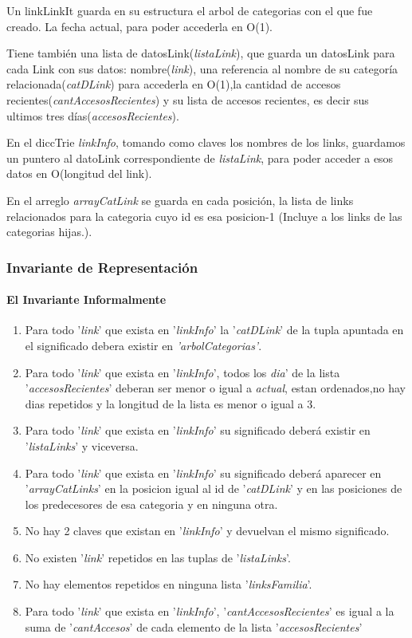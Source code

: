 \par Un linkLinkIt guarda en su estructura el arbol de categorias con el que fue creado. La fecha actual, para poder accederla en O(1).
\par Tiene también una lista de datosLink(\textit{listaLink}), que guarda un datosLink para cada Link con sus datos: nombre(\textit{link}), una referencia al nombre de su categoría relacionada(\textit{catDLink}) para accederla en O(1),la cantidad de accesos recientes(\textit{cantAccesosRecientes}) y su lista de accesos recientes, es decir sus ultimos tres días(\textit{accesosRecientes}).
\par En el diccTrie \textit{linkInfo}, tomando como claves los nombres de los links, guardamos un puntero al datoLink correspondiente de \textit{listaLink}, para poder acceder a esos datos en O(longitud del link).
\par En el arreglo \textit{arrayCatLink} se guarda en cada posición, la lista de links relacionados para la categoria cuyo id es esa posicion-1 (Incluye a los links de las categorias hijas.).

\subsubsection{Invariante de Representaci\'on}
\paragraph{El Invariante Informalmente}
\begin{enumerate}
\item Para todo '\textit{link}' que exista en '\textit{linkInfo}' la '\textit{catDLink}' de la tupla apuntada en el significado debera existir en \textit{'arbolCategorias'}.
\item Para todo '\textit{link}' que exista en '\textit{linkInfo}', todos los \textit{dia}' de la lista '\textit{accesosRecientes}' deberan ser menor o igual a \textit{actual}, estan ordenados,no hay dias repetidos y la longitud de la lista es menor o igual a 3.
\item Para todo '\textit{link}' que exista en '\textit{linkInfo}' su significado deberá existir en '\textit{listaLinks}' y viceversa.
\item Para todo '\textit{link}' que exista en '\textit{linkInfo}' su significado deberá aparecer en '\textit{arrayCatLinks}' en la posicion igual al id de '\textit{catDLink}' y en las posiciones de los predecesores de esa categoria y en ninguna otra.
\item No hay 2 claves que existan en '\textit{linkInfo}' y devuelvan el mismo significado.
\item No existen '\textit{link}' repetidos en las tuplas de  '\textit{listaLinks}'.
\item No hay elementos repetidos en ninguna lista '\textit{linksFamilia}'.
\item Para todo '\textit{link}' que exista en '\textit{linkInfo}', '\textit{cantAccesosRecientes}' es igual a la suma de '\textit{cantAccesos}' de cada elemento de la lista '\textit{accesosRecientes}'
\end{enumerate}

